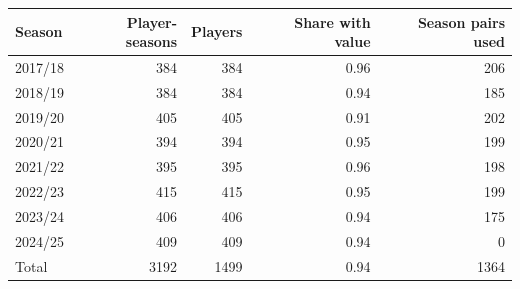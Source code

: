 \begin{tabular}{lrrrr}
\toprule
Season & Player-seasons & Players & Share with value & Season pairs used \\
\midrule
2017/18 & 384 & 384 & 0.96 & 206 \\
2018/19 & 384 & 384 & 0.94 & 185 \\
2019/20 & 405 & 405 & 0.91 & 202 \\
2020/21 & 394 & 394 & 0.95 & 199 \\
2021/22 & 395 & 395 & 0.96 & 198 \\
2022/23 & 415 & 415 & 0.95 & 199 \\
2023/24 & 406 & 406 & 0.94 & 175 \\
2024/25 & 409 & 409 & 0.94 & 0 \\
Total & 3192 & 1499 & 0.94 & 1364 \\
\bottomrule
\end{tabular}
